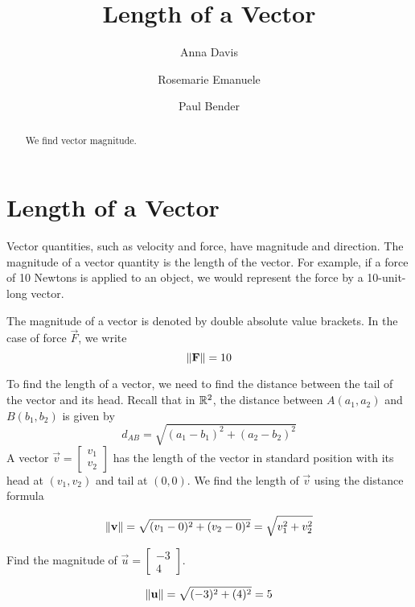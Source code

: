 \documentclass{ximera}
\author{Anna Davis \and Rosemarie Emanuele \and Paul Bender} \title{Length of a Vector} \license{CC-BY 4.0}
\begin{document}
\begin{abstract}
 We find vector magnitude.
\end{abstract}
\maketitle

\section*{Length of a Vector}

Vector quantities, such as velocity and force, have magnitude and direction.  The magnitude of a vector quantity is the length of the vector.  For example, if a force of 10 Newtons is applied to an object, we would represent the force by a 10-unit-long vector.

 \begin{center}
\end{center}

The magnitude of a vector is denoted by double absolute value brackets.  In the case of force $\vec{F}$, we write $$\left\lVert\mathbf{F}\right\rVert=10$$

To find the length of a vector, we need to find the distance between the tail of the vector and its head.  Recall that in $\mathbb{R}^2$, the distance between $A(a_1, a_2)$ and $B(b_1, b_2)$ is given by 
\begin{equation*}
d_{AB}=\sqrt{(a_1-b_1)^2+(a_2-b_2)^2}
\end{equation*}
A vector $\vec{v}=\begin{bmatrix}v_1\\ v_2\end{bmatrix}$ has the length of  the vector in standard position with its head at $(v_1, v_2)$ and tail at $(0, 0)$. We find the length of $\vec{v}$ using the distance formula

\begin{equation}\label{eq:normr2}
\left\lVert\mathbf{v}\right\rVert=\sqrt{(v_1-0)^2+(v_2-0)^2}=\sqrt{v_1^2+v_2^2}
\end{equation}

\begin{example}\label{ex:findmaginr2} Find the magnitude of $\vec{u}=\begin{bmatrix}-3\\4\end{bmatrix}$.  
\begin{center}
\end{center}
\begin{explanation}

 $$
\left\lVert\mathbf{u}\right\rVert=\sqrt{(-3)^2+(4)^2}=5
$$
\end{explanation}
\end{example}
\end{document}
